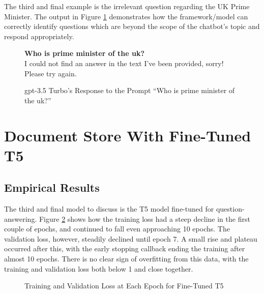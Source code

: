 The third and final example is the irrelevant question regarding the UK Prime Minister. The output in Figure \ref{fig:results_gpt_ex3} demonstrates how the framework/model can correctly identify questions which are beyond the scope of the chatbot's topic and respond appropriately.

\begin{figure}[ht!]
    \begin{itquote}
        \textbf{Who is prime minister of the uk?} \\
        I could not find an answer in the text I've been provided, sorry! Please try again.
    \end{itquote}
    \caption{\acrshort{gpt}-3.5 Turbo's Response to the Prompt ``Who is prime minister of the uk?''}
    \label{fig:results_gpt_ex3}
\end{figure}

\section{Document Store With Fine-Tuned T5}\label{sec:results_t5}
\subsection{Empirical Results}\label{sec:results_t5_empirical}
The third and final model to discuss is the T5 model fine-tuned for question-answering. Figure \ref{fig:results_t5_loss} shows how the training loss had a steep decline in the first couple of epochs, and continued to fall even approaching 10 epochs. The validation loss, however, steadily declined until epoch 7. A small rise and plateau occurred after this, with the early stopping callback ending the training after almost 10 epochs. There is no clear sign of overfitting from this data, with the training and validation loss both below 1 and close together. 

\begin{figure}[ht!]
\centering
{}
\caption{Training and Validation Loss at Each Epoch for Fine-Tuned T5}
\label{fig:results_t5_loss}
\end{figure}

